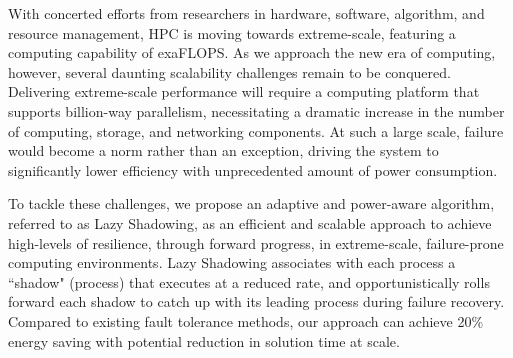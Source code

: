 With concerted efforts from researchers in hardware, software, algorithm, and resource management, HPC is moving towards extreme-scale, featuring a computing capability of exaFLOPS. 
As we approach the new era of computing, however, several daunting scalability challenges remain to be conquered. Delivering extreme-scale performance will require a computing platform that supports billion-way parallelism, necessitating a dramatic increase in the number of computing, storage, and networking components. At such a large scale, failure would become a norm rather than an exception, driving the system to significantly lower efficiency with unprecedented amount of power consumption. %

To tackle these challenges, we propose an adaptive and power-aware algorithm, referred to as Lazy Shadowing, as an efficient and scalable approach to achieve high-levels of resilience, through forward progress, in extreme-scale, failure-prone computing environments. 
Lazy Shadowing associates with each process a ``shadow" (process) that executes at a reduced rate, and opportunistically rolls forward each shadow to catch up with its leading process during failure recovery.
Compared to existing fault tolerance methods, our approach can achieve 20\% energy saving with potential reduction in solution time at scale.
